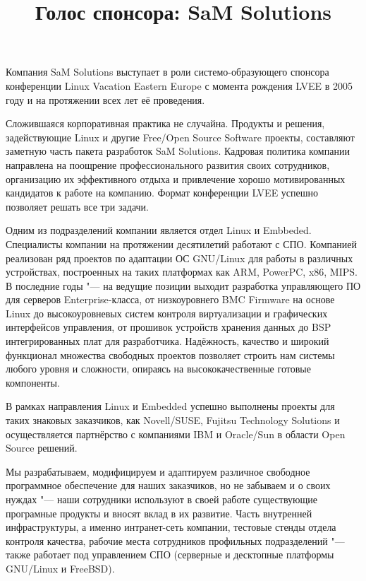 \documentclass[10pt, a5paper]{article}
\begin{document}
\title{Голос спонсора: SaM Solutions}
\date{}
\maketitle

Компания SaM Solutions выступает в роли системо-образующего спонсора конференции Linux Vacation Eastern Europe с момента рождения LVEE в 2005 году и на протяжении всех лет её проведения. 

Сложившаяся корпоративная практика не случайна. Продукты и решения, задействующие Linux и другие Free/Open Source Software проекты, составляют заметную часть пакета разработок SaM Solutions. Кадровая политика компании направлена на поощрение профессионального развития своих сотрудников, организацию их эффективного отдыха и привлечение хорошо мотивированных кандидатов к работе на компанию. Формат конференции LVEE успешно позволяет решать все три задачи. 

Одним из подразделений компании является отдел Linux и \linebreak Embbeded. Специалисты компании на протяжении десятилетий работают с СПО. Компанией реализован ряд проектов по адаптации ОС GNU/Linux для работы в различных устройствах, построенных на таких платформах как ARM, PowerPC, x86, MIPS. В последние годы "--- на ведущие позиции выходит разработка управляющего ПО для серверов Enterprise-класса, от низкоуровнего BMC Firmware на основе Linux до высокоуровневых систем контроля виртуализации и графических интерфейсов управления, от прошивок устройств хранения данных до BSP интегрированных плат для разработчика. Надёжность, качество и широкий функционал множества свободных проектов позволяет строить нам системы любого уровня и сложности, опираясь на высококачественные готовые компоненты.

В рамках направления Linux и Embedded успешно выполнены проекты для таких знаковых заказчиков, как  Novell/SUSE, Fujitsu Technology Solutions  и осуществляется партнёрство с компаниями IBM и Oracle/Sun в области Open Source решений.

Мы разрабатываем, модифицируем и адаптируем различное свободное программное обеспечение для наших заказчиков, но не забываем и о своих нуждах "--- наши сотрудники используют в своей работе существующие програмные продукты и вносят вклад в их развитие. Часть внутренней инфраструктуры, а именно интранет-сеть компании, тестовые стенды отдела контроля качества, рабочие места сотрудников профильных подразделений "--- также работает под управлением СПО (серверные и десктопные платформы GNU/Linux и FreeBSD). 
\end{document}
